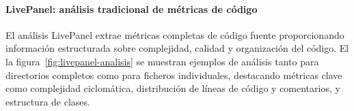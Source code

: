 \documentclass[a4paper, 12pt]{book}
\begin{document}
\paragraph{LivePanel: análisis tradicional de métricas de código}
El análisis LivePanel extrae métricas completas de código fuente proporcionando información estructurada sobre complejidad, calidad y organización del código. El la figura~\ref{fig:livepanel-analisis} se muestran ejemplos de análisis tanto para directorios completos como para ficheros individuales, destacando métricas clave como complejidad ciclomática, distribución de líneas de código y comentarios, y estructura de clases.



\end{document}
